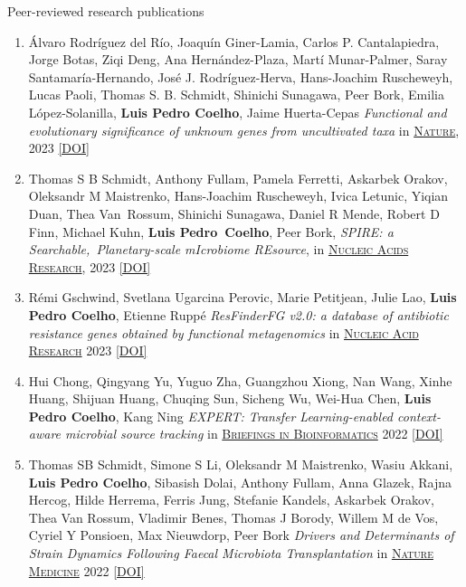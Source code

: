 \documentclass{article}
\renewcommand\subsubsection[1]{%
    \par\vspace{.1em}%
    {\hspace{1em}\subsubsubhead #1}%
    \par\vspace{.2em}%
}
\newcommand\showdoi[1]{%
    \href{http://dx.doi.org/#1}{[DOI]}%
}
\newcommand\pubname[1]{\textsc{\uline{#1}}}
\begin{document}
\subsubsection{Peer-reviewed research publications}

\begin{enumerate}[resume]
\item Álvaro Rodríguez del Río, Joaquín Giner-Lamia, Carlos P. Cantalapiedra, Jorge Botas, Ziqi Deng, Ana Hernández-Plaza, Martí Munar-Palmer, Saray Santamaría-Hernando, José J. Rodríguez-Herva, Hans-Joachim Ruscheweyh, Lucas Paoli, Thomas S. B. Schmidt, Shinichi Sunagawa, Peer Bork, Emilia López-Solanilla, \textbf{Luis Pedro Coelho}, Jaime Huerta-Cepas \emph{Functional and evolutionary significance of unknown genes from uncultivated taxa} in \pubname{Nature}, 2023 \showdoi{10.1038/s41586-023-06955-z}

\item Thomas S B Schmidt, Anthony Fullam, Pamela Ferretti, Askarbek Orakov, Oleksandr M Maistrenko, Hans-Joachim Ruscheweyh, Ivica Letunic, Yiqian Duan, Thea Van Rossum, Shinichi Sunagawa, Daniel R Mende, Robert D Finn, Michael Kuhn, \textbf{Luis Pedro Coelho}, Peer Bork, \emph{SPIRE: a Searchable, Planetary-scale mIcrobiome REsource}, in \pubname{Nucleic Acids Research}, 2023 \showdoi{10.1093/nar/gkad943}

\item Rémi Gschwind, Svetlana Ugarcina Perovic, Marie Petitjean, Julie Lao, \textbf{Luis Pedro Coelho}, Etienne Ruppé \emph{ResFinderFG v2.0: a database of antibiotic resistance genes obtained by functional metagenomics} in \pubname{Nucleic Acid Research} 2023 \showdoi{10.1093/nar/gkad384}

\item Hui Chong, Qingyang Yu, Yuguo Zha, Guangzhou Xiong, Nan Wang, Xinhe Huang, Shijuan Huang, Chuqing Sun, Sicheng Wu, Wei-Hua Chen, \textbf{Luis Pedro Coelho}, Kang Ning \emph{EXPERT: Transfer Learning-enabled context-aware microbial source tracking} in \pubname{Briefings in Bioinformatics} 2022 \showdoi{10.1093/bib/bbac396}

\item Thomas SB Schmidt, Simone S Li, Oleksandr M Maistrenko, Wasiu Akkani, \textbf{Luis Pedro Coelho}, Sibasish Dolai, Anthony Fullam, Anna Glazek, Rajna Hercog, Hilde Herrema, Ferris Jung, Stefanie Kandels, Askarbek Orakov, Thea Van Rossum, Vladimir Benes, Thomas J Borody, Willem M de Vos, Cyriel Y Ponsioen, Max Nieuwdorp, Peer Bork \emph{Drivers and Determinants of Strain Dynamics Following Faecal Microbiota Transplantation} in \pubname{Nature Medicine} 2022 \showdoi{10.1038/s41591-022-01913-0}


\end{enumerate}
\end{document}
